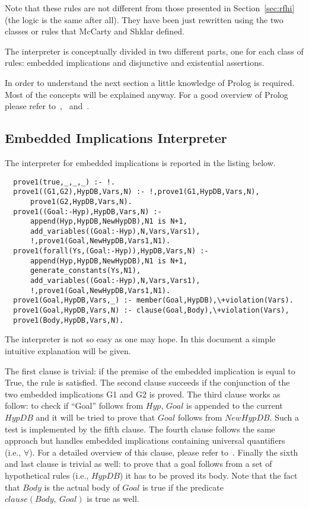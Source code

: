 Note that these rules are not different from those presented in Section~\ref{sec:rfhi}
(the logic is the same after all). They have been just rewritten using the two classes
or rules that McCarty and Shklar defined.

The interpreter is conceptually divided in two different parts, one for each class of
rules: embedded implications and disjunctive and existential assertions.

In order to understand the next section a little knowledge of Prolog is required.
Most of the concepts will be explained anyway. For a good overview of Prolog
please refer to~\cite{Prolog1},~\cite{Prolog2} and~\cite{Prolog3}.

\subsection{Embedded Implications Interpreter}
\label{sec:eii}

The interpreter for embedded implications is reported in the listing below.

\begin{lstlisting}
  prove1(true,_,_,_) :- !.
  prove1((G1,G2),HypDB,Vars,N) :- !,prove1(G1,HypDB,Vars,N),
      prove1(G2,HypDB,Vars,N).
  prove1((Goal:-Hyp),HypDB,Vars,N) :-
      append(Hyp,HypDB,NewHypDB),N1 is N+1,
      add_variables((Goal:-Hyp),N,Vars,Vars1),
      !,prove1(Goal,NewHypDB,Vars1,N1).
  prove1(forall(Ys,(Goal:-Hyp)),HypDB,Vars,N) :-
      append(Hyp,HypDB,NewHypDB),N1 is N+1,
      generate_constants(Ys,N1),
      add_variables((Goal:-Hyp),N,Vars,Vars1),
      !,prove1(Goal,NewHypDB,Vars1,N1).
  prove1(Goal,HypDB,Vars,_) :- member(Goal,HypDB),\+violation(Vars).
  prove1(Goal,HypDB,Vars,N) :- clause(Goal,Body),\+violation(Vars),
  prove1(Body,HypDB,Vars,N).
\end{lstlisting}

The interpreter is not so easy as one may hope. In this document a simple
intuitive explanation will be given.

The first clause is trivial: if the premise of the embedded implication is equal to True,
the rule is satisfied. The second clause succeeds if the conjunction of the two embedded implications
G1 and G2 is proved. The third clause works as follow: to check if ``Goal''
follows from $Hyp$, $Goal$ is appended to the current $HypDB$ and it will be tried to
prove that $Goal$ follows from $NewHypDB$. Such a test is implemented by the
fifth clause. The fourth clause follows the
same approach but handles embedded implications containing universal quantifiers
(i.e., $\forall$). For a detailed overview of this clause, please refer to~\cite{McCartyS94}.
Finally the sixth and last clause is trivial as well: to prove that a goal follows
from a set of hypothetical rules (i.e., $HypDB$) it has to be proved its body. Note
that the fact that $Body$ is the actual body of $Goal$ is true if the
predicate $clause(Body,\ Goal)$ is true as well.



